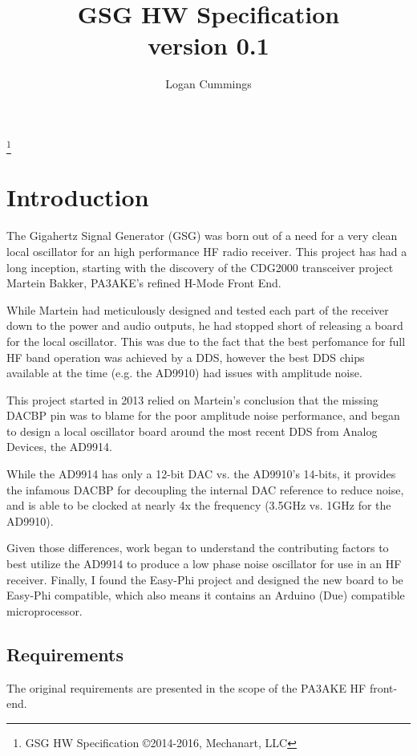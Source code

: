 \documentclass[letterpaper,12pt]{article}
\title{GSG HW Specification \\ \vspace{2 mm} {\large version 0.1}}
\author{Logan Cummings}
\begin{document}
\maketitle
\renewcommand*\footnoterule{}
\let\thefootnote\relax\footnote{GSG \hfill HW Specification  \hfill {\copyright{2014-2016, Mechanart, LLC}}}
\newpage
\tableofcontents

\section{Introduction}

The Gigahertz Signal Generator (GSG) was born out of a need for a very clean 
local oscillator for an high performance HF radio receiver. This project 
has had a long inception, starting with the discovery of the CDG2000 
transceiver project Martein Bakker, PA3AKE's refined H-Mode Front End.

While Martein had meticulously designed and tested each part of the receiver 
down to the power and audio outputs, he had stopped short of releasing a 
board for the local oscillator. This was due to the fact that the best perfomance 
for full  HF band operation was achieved by a DDS, however the best DDS chips
available at the time (e.g. the AD9910) had issues with amplitude noise.

This project started in 2013 relied on Martein's conclusion that the missing 
DACBP pin was to blame for the poor amplitude noise performance, and began to 
design a local oscillator board around the most recent DDS from Analog Devices, 
the AD9914.

While the AD9914 has only a 12-bit DAC vs. the AD9910's 14-bits, it provides the 
infamous DACBP for decoupling the internal DAC reference to reduce noise, and is able 
to be clocked at nearly 4x the frequency (3.5GHz vs. 1GHz for the AD9910). 

Given those differences, work began to understand the contributing factors to 
best utilize the AD9914 to produce a low phase noise oscillator for use in an 
HF receiver. Finally, I found the Easy-Phi project and designed the new board to 
be Easy-Phi compatible, which also means it contains an Arduino (Due) compatible 
microprocessor.

\subsection{Requirements}
The original requirements are presented in the scope of the PA3AKE HF 
front-end.
\end{document}
